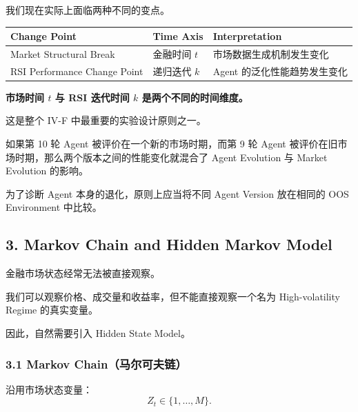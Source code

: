 我们现在实际上面临两种不同的变点。

\begin{readertable}
\begin{longtable}[]{@{}
  >{\raggedright\arraybackslash}p{}
  >{\raggedright\arraybackslash}p{}
  >{\raggedright\arraybackslash}p{}@{}}
\toprule
Change Point & Time Axis & Interpretation \\
\midrule
\endhead
Market Structural Break & 金融时间 \(t\) & 市场数据生成机制发生变化 \\
RSI Performance Change Point & 递归迭代 \(k\) & Agent 的泛化性能趋势发生变化 \\
\bottomrule
\end{longtable}
\end{readertable}

\textbf{市场时间 \(t\) 与 RSI 迭代时间 \(k\) 是两个不同的时间维度。}

这是整个 IV-F 中最重要的实验设计原则之一。

如果第 10 轮 Agent 被评价在一个新的市场时期，而第 9 轮 Agent 被评价在旧市场时期，那么两个版本之间的性能变化就混合了 Agent Evolution 与 Market Evolution 的影响。

为了诊断 Agent 本身的退化，原则上应当将不同 Agent Version 放在相同的 OOS Environment 中比较。

\hypertarget{part-4-77-0001-markov-chain-and-hidden-markov-model}{%
\subsection{3. Markov Chain and Hidden Markov Model}\label{part-4-77-0001-markov-chain-and-hidden-markov-model}}

金融市场状态经常无法被直接观察。

我们可以观察价格、成交量和收益率，但不能直接观察一个名为 High-volatility Regime 的真实变量。

因此，自然需要引入 Hidden State Model。

\hypertarget{part-4-77-0001-markov-chainux9a6cux5c14ux53efux592bux94fe}{%
\subsubsection{3.1 Markov Chain（马尔可夫链）}\label{part-4-77-0001-markov-chainux9a6cux5c14ux53efux592bux94fe}}

沿用市场状态变量：
\[Z_t\in\{1,\ldots,M\}.\]

